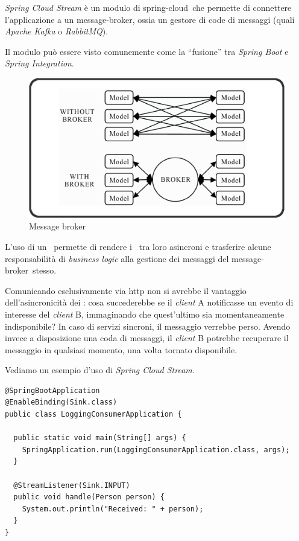 \textit{Spring Cloud Stream} è un modulo di \gls{spring-cloud}\gloss\ che permette di connettere l'applicazione a un \gls{message-broker}\gloss,
ossia un gestore di code di messaggi (quali \textit{Apache Kafka} o \textit{RabbitMQ}).

Il modulo può essere visto comunemente come la ``fusione'' tra \textit{Spring Boot} e \textit{Spring Integration}.

\begin{figure}[H]
	\centering
	\includegraphics[width=\textwidth]{immagini/message-broker.png}
	\caption[Message broker]{Message broker\footnotemark}
	\label{fig:message-broker}
\end{figure}

L'uso di un \gloss\ permette di rendere i \gloss\ tra loro asincroni e trasferire alcune responsabilità di \textit{business logic} alla gestione dei messaggi del \gls{message-broker}\gloss\ stesso.

Comunicando esclusivamente via \acrshort{http} non si avrebbe il vantaggio dell'asincronicità dei \gloss: cosa succederebbe se il \textit{client} A notificasse un evento di interesse del \textit{client} B, immaginando che quest'ultimo sia momentaneamente indisponibile?
In caso di servizi sincroni, il messaggio verrebbe perso. Avendo invece a disposizione una coda di messaggi, il \textit{client} B potrebbe recuperare il messaggio in qualsiasi momento, una volta tornato disponibile.

Vediamo un esempio d'uso di \textit{Spring Cloud Stream}.
\begin{tcolorbox}
	\begin{lstlisting}
@SpringBootApplication
@EnableBinding(Sink.class)
public class LoggingConsumerApplication {

  public static void main(String[] args) {
    SpringApplication.run(LoggingConsumerApplication.class, args);
  }

  @StreamListener(Sink.INPUT)
  public void handle(Person person) {
    System.out.println("Received: " + person);
  }
}
	\end{lstlisting}
\end{tcolorbox}

